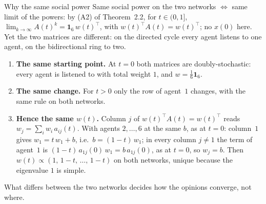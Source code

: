 \documentclass[10pt, aspectratio=169]{beamer}
\begin{document}
\begin{frame}[label=m-fdg-why]{Why the same social power}
  \small
  Same social power on the two networks $\iff$ same limit of the powers: by (A2) of
  Theorem~2.2, for $t \in (0,1]$, $\lim_{k \to \infty} A(t)^k = \mathbf{1}_6\, w(t)^\top$,
  with $w(t)^\top A(t) = w(t)^\top$; no $x(0)$ here. Yet the two matrices are different:
  on the directed cycle every agent listens to one agent, on the bidirectional ring to two.

  \medskip
  \begin{enumerate}
    \setlength{\itemsep}{4pt}
    \item \textbf{The same starting point.} At $t = 0$ both matrices are doubly-stochastic:
          every agent is listened to with total weight $1$, and $w = \frac16\mathbf{1}_6$.
    \item \textbf{The same change.} For $t > 0$ only the row of agent~$1$ changes, with the
          same rule on both networks.
    \item \textbf{Hence the same $w(t)$.} Column $j$ of $w(t)^\top A(t) = w(t)^\top$ reads
          $w_j = \sum_i w_i\, a_{ij}(t)$. With agents $2, \dots, 6$ at the same $b$, as at
          $t = 0$: column~$1$ gives $w_1 = t\, w_1 + b$, i.e.\ $b = (1-t)\, w_1$; in every
          column $j \neq 1$ the term of agent~$1$ is $(1-t)\, a_{1j}(0)\, w_1 = b\,
          a_{1j}(0)$, as at $t = 0$, so $w_j = b$. Then
          $w(t) \propto (1,\, 1-t,\, \dots,\, 1-t)$ on both networks, unique because the
          eigenvalue $1$ is simple.
  \end{enumerate}

  \medskip
  \alert{What differs between the two networks decides how the opinions converge, not
  where.}
\end{frame}
\end{document}
